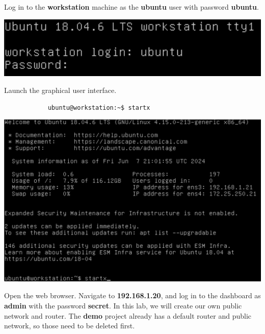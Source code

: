 \documentclass[letterpaper, 12pt]{article}
\begin{document}
\begin{enumerate}
    \begin{labstep}
        Log in to the \textbf{workstation} machine as the \textbf{ubuntu} user with password \textbf{ubuntu}.

        \begin{center}
            \includegraphics[width=\linewidth]{images/part1/step1.png}
        \end{center}
    \end{labstep}

    \begin{labstep}
        Launch the graphical user interface.
        \begin{lstlisting}
            ubuntu@workstation:~$ startx
        \end{lstlisting}

        \begin{center}
            \includegraphics[width=\linewidth]{images/part1/step2.png}
        \end{center}
    \end{labstep}

    \begin{labstep}
        Open the web browser.
        Navigate to \textbf{192.168.1.20}, and log in to the dashboard as \textbf{admin} with the password \textbf{secret}.
        In this lab, we will create our own public network and router.
        The \textbf{demo} project already has a default router and public network, so those need to be deleted first.


\end{labstep}
\end{enumerate}
\end{document}
